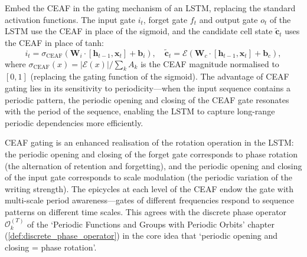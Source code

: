\begin{definition}\label{def:eaf_lstm}
Embed the CEAF in the gating mechanism of an LSTM, replacing the standard activation functions. The input gate $i_t$, forget gate $f_t$ and output gate $o_t$ of the LSTM use the CEAF in place of the sigmoid, and the candidate cell state $\tilde{\mathbf{c}}_t$ uses the CEAF in place of tanh:
\[
i_t = \sigma_{\text{CEAF}}(\mathbf{W}_i \cdot [\mathbf{h}_{t-1}, \mathbf{x}_t] + \mathbf{b}_i), \quad \tilde{\mathbf{c}}_t = \mathcal{E}(\mathbf{W}_c \cdot [\mathbf{h}_{t-1}, \mathbf{x}_t] + \mathbf{b}_c),
\]
where $\sigma_{\text{CEAF}}(x) = |\mathcal{E}(x)| / \sum_k A_k$ is the CEAF magnitude normalised to $[0,1]$ (replacing the gating function of the sigmoid). The advantage of CEAF gating lies in its sensitivity to periodicity---when the input sequence contains a periodic pattern, the periodic opening and closing of the CEAF gate resonates with the period of the sequence, enabling the LSTM to capture long-range periodic dependencies more efficiently.

CEAF gating is an enhanced realisation of the rotation operation in the LSTM: the periodic opening and closing of the forget gate corresponds to phase rotation (the alternation of retention and forgetting), and the periodic opening and closing of the input gate corresponds to scale modulation (the periodic variation of the writing strength). The epicycles at each level of the CEAF endow the gate with multi-scale period awareness---gates of different frequencies respond to sequence patterns on different time scales. This agrees with the discrete phase operator $\mathcal{O}_k^{(T)}$ of the `Periodic Functions and Groups with Periodic Orbits' chapter (\cref{def:discrete_phase_operator}) in the core idea that `periodic opening and closing = phase rotation'.
\end{definition}


